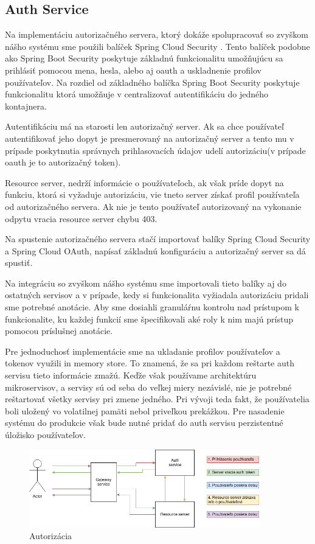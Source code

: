 \subsection{Auth Service} 

Na implementáciu autorizačného servera, ktorý dokáže spolupracovať so zvyškom nášho systému sme použili balíček Spring Cloud Security \cite{cloud_security}. Tento balíček podobne ako Spring Boot Security poskytuje základnú funkcionalitu umožňujúcu sa prihlásiť pomocou mena, hesla, alebo aj \acrshort{oauth} a uskladnenie profilov používateľov. 
Na rozdiel od základného balíčka Spring Boot Security poskytuje funkcionalitu ktorá umožňuje v centralizovať autentifikáciu do jedného kontajnera. 

Autentifikáciu má na starosti len autorizačný server. Ak sa chce používateľ autentifikovať jeho dopyt je presmerovaný na autorizačný server a tento mu v prípade poskytnutia správnych prihlasovacích údajov udelí autorizáciu(v prípade \acrshort{oauth} je to autorizačný token).  

Resource server, nedrží informácie o používateľoch, ak však príde dopyt na funkciu, ktorá si vyžaduje autorizáciu, vie tneto server získať profil používateľa od autorizačného servera. Ak nie je tento používateľ autorizovaný na vykonanie odpytu vracia resource server chybu 403.

Na spustenie autorizačného servera stačí importovať balíky  Spring Cloud Security a Spring Cloud OAuth, napísať základnú konfiguráciu a autorizačný server sa dá spustiť.  

Na integráciu so zvyškom nášho systému sme importovali tieto balíky aj do ostatných servisov a v prípade, kedy si funkcionalita vyžiadala autorizáciu  pridali sme potrebné anotácie. Aby sme dosiahli granuláŕnu kontrolu nad prístupom k funkcionalite, ku každej funkcií sme špecifikovali aké roly k nim majú prístup pomocou príslušnej anotácie. 

Pre jednoduchosť implementácie sme na ukladanie profilov používateľov a tokenov využili in memory store. To znamená, že sa pri každom reštarte auth servisu tieto informácie zmažú. Keďže však používame architektúru mikroservisov, a servisy sú od seba do veľkej miery nezávislé, nie je potrebné reštartovať všetky servisy pri zmene jedného. Pri vývoji teda fakt, že používatelia boli uložený vo volatilnej pamäti nebol priveľkou prekážkou. Pre nasadenie systému do produkcie však bude nutné pridať do auth servisu perzistentné úložisko používateľov.  

\begin{figure}[!htbp] 
	\centering 
	\includegraphics[width=10cm]{img/auth_operation.png} 
	\caption{Autorizácia} 
	\label{auth_operation} 
\end{figure}  


